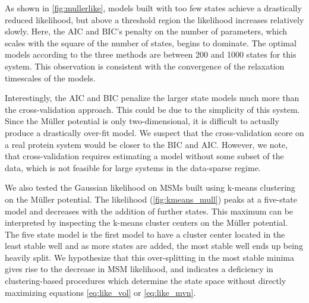 \documentclass[twocolumn,floatfix,nofootinbib,aps]{revtex4-1}
\begin{document}
As shown in \cref{fig:mullerlike}, models built with too few states achieve a drastically reduced likelihood, but above a threshold region the likelihood increases relatively slowly. Here, the AIC and BIC's penalty on the number of parameters, which scales with the square of the number of states, begins to dominate. The optimal models according to the three methods are between 200 and 1000 states for this system. This observation is consistent with the convergence of the relaxation timescales of the models.

Interestingly, the AIC and BIC penalize the larger state models much more than the cross-validation approach. This could be due to the simplicity of this system. Since the M\"uller potential is only two-dimensional, it is difficult to actually produce a drastically over-fit model. We suspect that the cross-validation score on a real protein system would be closer to the BIC and AIC. However, we note, that cross-validation requires estimating a model without some subset of the data, which is not feasible for large systems in the data-sparse regime.

We also tested the Gaussian likelihood on MSMs built using k-means clustering on the M\"uller potential. The likelihood (\cref{fig:kmeans_mull}) peaks at a five-state model and decreases with the addition of further states. This maximum can be interpreted by inspecting the k-means cluster centers on the M\"uller potential. The five state model is the first model to have a cluster center located in the least stable well and as more states are added, the most stable well ends up being heavily split. We hypothesize that this over-splitting in the most stable minima gives rise to the decrease in MSM likelihood, and indicates a deficiency in clustering-based procedures which determine the state space without directly maximizing equations \ref{eq:like_vol} or \ref{eq:like_mvn}.
\end{document}
